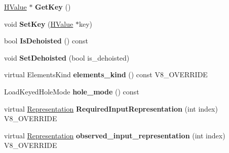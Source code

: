 \begin{DoxyCompactItemize}
\item 
\hypertarget{classv8_1_1internal_1_1_v8___f_i_n_a_l_a123feb67fadfb09b70c9b6898220c081}{}\hyperlink{classv8_1_1internal_1_1_h_value}{H\+Value} $\ast$ {\bfseries Get\+Key} ()\label{classv8_1_1internal_1_1_v8___f_i_n_a_l_a123feb67fadfb09b70c9b6898220c081}

\item 
\hypertarget{classv8_1_1internal_1_1_v8___f_i_n_a_l_a358155257d203c4b708eab865573eb69}{}void {\bfseries Set\+Key} (\hyperlink{classv8_1_1internal_1_1_h_value}{H\+Value} $\ast$key)\label{classv8_1_1internal_1_1_v8___f_i_n_a_l_a358155257d203c4b708eab865573eb69}

\item 
\hypertarget{classv8_1_1internal_1_1_v8___f_i_n_a_l_a4d58e84a5f0887aab90493145d6ea268}{}bool {\bfseries Is\+Dehoisted} () const \label{classv8_1_1internal_1_1_v8___f_i_n_a_l_a4d58e84a5f0887aab90493145d6ea268}

\item 
\hypertarget{classv8_1_1internal_1_1_v8___f_i_n_a_l_a64724188651b4553702aba14841ba8c9}{}void {\bfseries Set\+Dehoisted} (bool is\+\_\+dehoisted)\label{classv8_1_1internal_1_1_v8___f_i_n_a_l_a64724188651b4553702aba14841ba8c9}

\item 
\hypertarget{classv8_1_1internal_1_1_v8___f_i_n_a_l_a7733867782b5386235fb9a25623b315d}{}virtual Elements\+Kind {\bfseries elements\+\_\+kind} () const V8\+\_\+\+O\+V\+E\+R\+R\+I\+D\+E\label{classv8_1_1internal_1_1_v8___f_i_n_a_l_a7733867782b5386235fb9a25623b315d}

\item 
\hypertarget{classv8_1_1internal_1_1_v8___f_i_n_a_l_acce759a5a138928920358f85ff5d1457}{}Load\+Keyed\+Hole\+Mode {\bfseries hole\+\_\+mode} () const \label{classv8_1_1internal_1_1_v8___f_i_n_a_l_acce759a5a138928920358f85ff5d1457}

\item 
\hypertarget{classv8_1_1internal_1_1_v8___f_i_n_a_l_a6c6d1f37f40b113d8f4062f1ffff7215}{}virtual \hyperlink{classv8_1_1internal_1_1_representation}{Representation} {\bfseries Required\+Input\+Representation} (int index) V8\+\_\+\+O\+V\+E\+R\+R\+I\+D\+E\label{classv8_1_1internal_1_1_v8___f_i_n_a_l_a6c6d1f37f40b113d8f4062f1ffff7215}

\item 
\hypertarget{classv8_1_1internal_1_1_v8___f_i_n_a_l_a0ae00f2f3ee0cfa82cd7f5d92e2db4b4}{}virtual \hyperlink{classv8_1_1internal_1_1_representation}{Representation} {\bfseries observed\+\_\+input\+\_\+representation} (int index) V8\+\_\+\+O\+V\+E\+R\+R\+I\+D\+E\label{classv8_1_1internal_1_1_v8___f_i_n_a_l_a0ae00f2f3ee0cfa82cd7f5d92e2db4b4}


\end{DoxyCompactItemize}
